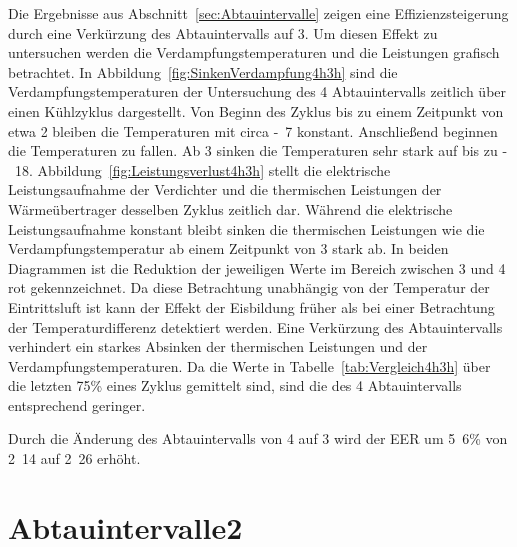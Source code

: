 Die Ergebnisse aus Abschnitt~\ref{sec:Abtauintervalle} zeigen eine Effizienzsteigerung durch eine Verkürzung des Abtauintervalls auf \unit{3}{\hour}. Um diesen Effekt zu untersuchen werden die Verdampfungstemperaturen und die Leistungen grafisch betrachtet.
In Abbildung~\ref{fig:SinkenVerdampfung4h3h} sind die Verdampfungstemperaturen der Untersuchung des \unit{4}{\hour} Abtauintervalls zeitlich über einen Kühlzyklus dargestellt. Von Beginn des Zyklus bis zu einem Zeitpunkt von etwa \unit{2}{\hour} bleiben die Temperaturen mit circa \unit{-7}{\celsius} konstant. Anschließend beginnen die Temperaturen zu fallen. Ab \unit{3}{\hour} sinken die Temperaturen sehr stark auf bis zu \unit{-18}{\celsius}.
Abbildung~\ref{fig:Leistungsverlust4h3h} stellt die elektrische Leistungsaufnahme der Verdichter und die thermischen Leistungen der Wärmeübertrager desselben Zyklus zeitlich dar. Während die elektrische Leistungsaufnahme konstant bleibt sinken die thermischen Leistungen wie die Verdampfungstemperatur ab einem Zeitpunkt von \unit{3}{\hour} stark ab. In beiden Diagrammen ist die Reduktion der jeweiligen Werte im Bereich zwischen \unit{3}{\hour} und \unit{4}{\hour} rot gekennzeichnet. \newline
Da diese Betrachtung unabhängig von der Temperatur der Eintrittsluft ist kann der Effekt der Eisbildung früher als bei einer Betrachtung der Temperaturdifferenz detektiert werden. Eine Verkürzung des Abtauintervalls verhindert ein starkes Absinken der thermischen Leistungen und der Verdampfungstemperaturen. Da die Werte in Tabelle~\ref{tab:Vergleich4h3h} über die letzten \unit{75}{\%} eines Zyklus gemittelt sind, sind die des \unit{4}{\hour} Abtauintervalls entsprechend geringer.

Durch die Änderung des Abtauintervalls von \unit{4}{\hour} auf \unit{3}{\hour} wird der EER um \unit{5.6}{\%} von \unit{2.14}{} auf \unit{2.26}{} erhöht.








\section{Abtauintervalle2}
\label{sec:AbtauintervalleAnalyse2}

